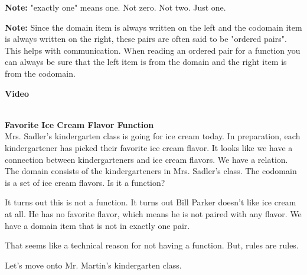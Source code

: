\documentclass{ximera}
\begin{document}
\begin{observation} 
\textbf{Note:} "exactly one" means one. Not zero. Not two. Just one.
\end{observation}

\begin{observation} 
\textbf{Note:} Since the domain item is always written on the left and the codomain item is always written on the right, these pairs are often said to be "ordered pairs". This helps with communication. When reading an ordered pair for a function you can always be sure that the left item is from the domain and the right item is from the codomain.
\end{observation}


\begin{explanation} \textbf{Video}
\begin{center}
\end{center}
\end{explanation}

\quad \\


\textbf{Favorite Ice Cream Flavor Function} \\

Mrs. Sadler's kindergarten class is going for ice cream today.  In preparation, each kindergartener has picked their favorite ice cream flavor. It looks like we have a connection between kindergarteners and ice cream flavors.  We have a relation.  The domain consists of the kindergarteners in Mrs. Sadler's class.  The codomain is a set of ice cream flavors. Is it a function?

It turns out this is not a function.  It turns out Bill Parker doesn't like ice cream at all. He has no favorite flavor, which means he is not paired with any flavor.  We have a domain item that is not in exactly one pair.

That seems like a technical reason for not having a function.  But, rules are rules.  

Let's move onto Mr. Martin's kindergarten class.
\end{document}
